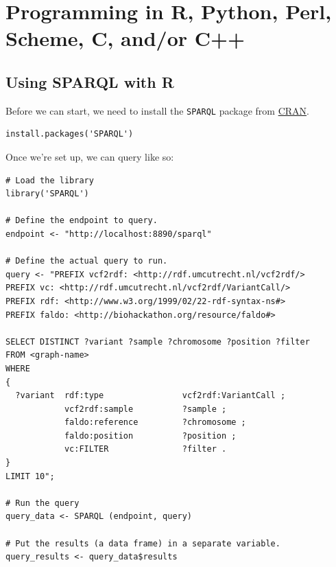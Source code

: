 \documentclass[11pt,a4paper,oneside]{book}
\begin{document}
\chapter{Programming in R, Python, Perl, Scheme, C, and/or C++}
\label{chap:programming}

\section{Using SPARQL with R}
\label{sec:sparql-with-r}

  Before we can start, we need to install the \texttt{SPARQL} package from
  \href{https://cran.r-project.org/web/packages/SPARQL/index.html}{CRAN}.

\begin{siderules}
\begin{verbatim}
install.packages('SPARQL')
\end{verbatim}
\end{siderules}

  Once we're set up, we can query like so:

\begin{siderules}
\begin{verbatim}
# Load the library
library('SPARQL')

# Define the endpoint to query.
endpoint <- "http://localhost:8890/sparql"

# Define the actual query to run.
query <- "PREFIX vcf2rdf: <http://rdf.umcutrecht.nl/vcf2rdf/>
PREFIX vc: <http://rdf.umcutrecht.nl/vcf2rdf/VariantCall/>
PREFIX rdf: <http://www.w3.org/1999/02/22-rdf-syntax-ns#>
PREFIX faldo: <http://biohackathon.org/resource/faldo#>

SELECT DISTINCT ?variant ?sample ?chromosome ?position ?filter
FROM <graph-name>
WHERE
{
  ?variant  rdf:type                vcf2rdf:VariantCall ;
            vcf2rdf:sample          ?sample ;
            faldo:reference         ?chromosome ;
            faldo:position          ?position ;
            vc:FILTER               ?filter .
}
LIMIT 10";

# Run the query
query_data <- SPARQL (endpoint, query)

# Put the results (a data frame) in a separate variable.
query_results <- query_data$results
\end{verbatim}
\end{siderules}
\end{document}
